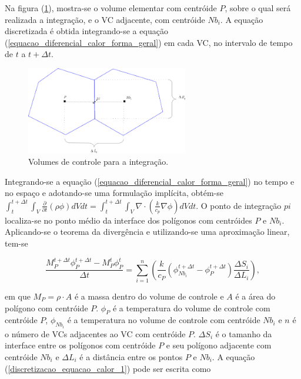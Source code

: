 Na figura (\ref{fig_volume_controle_integracao}), mostra-se o volume elementar com centróide $P$, sobre o qual será realizada a integração, e o VC adjacente, com centróide $Nb_{i}$. A equação discretizada é obtida integrando-se a equação (\ref{equacao_diferencial_calor_forma_geral}) em cada VC, no intervalo de tempo de $t$ a $t+ \Delta t$. 

\begin{figure}[!ht]
  \centering
  \includegraphics[width=200pt]{imagens_discretizacao/volume_controle_integracao.png}
  \caption{\footnotesize{Volumes de controle para a integração.
}}
  \label{fig_volume_controle_integracao}
\end{figure}

Integrando-se a equação (\ref{equacao_diferencial_calor_forma_geral}) no tempo e no espaço e adotando-se uma formulação implícita, obtém-se $
 \int_{t}^{t+ \Delta t}\int_{V} \frac {\partial} {\partial t} (\rho \phi) dV dt = \int_{t}^{t+ \Delta t} \int_{V} \nabla \cdot \left( \frac { k } { c_{p} } \nabla \phi \right) dV dt.$ O ponto de integração $pi$ localiza-se no ponto médio da interface dos polígonos com centróides $P$ e $Nb_{i}$. Aplicando-se o teorema da divergência e utilizando-se uma aproximação linear, tem-se

\begin{equation}
 \frac { M_{P}^{t + \Delta t} \phi_P^{t + \Delta t} - M_{P}^{t} \phi_{P}^{t} } { \Delta t} = \sum_{i=1}^{n} \left( \frac {k} {c_P} \left( \phi_{Nb_{i}}^{t + \Delta t} - \phi_{P}^{t + \Delta t} \right) \frac {\Delta S_{i}} {\Delta L_{i}} \right),
 \label {discretizacao_equacao_calor_1}
\end{equation}

\noindent em que $M_{P}=\rho \cdot A$ é a massa dentro do volume de controle e $A$ é a área do polígono com centróide $P$. $\phi_{P}$ é a temperatura do volume de controle com centróide $P$, $\phi_{Nb_{i}}$ é a temperatura no volume de controle com centróide $Nb_{i}$ e $n$ é o número de VCs adjacentes ao VC com centróide $P$. $\Delta S_i$ é o tamanho da interface entre os polígonos com centróide $P$ e seu polígono adjacente com centróide $Nb_i$ e $\Delta L_i$ é a distância entre os pontos $P$ e $Nb_i$. A equação (\ref{discretizacao_equacao_calor_1}) pode ser escrita como

